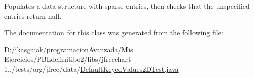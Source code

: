 Populates a data structure with sparse entries, then checks that the unspecified entries return null. 

The documentation for this class was generated from the following file\+:\begin{DoxyCompactItemize}
\item 
D\+:/ikasgaiak/programacion\+Avanzada/\+Mis Ejercicios/\+P\+B\+Ldefinitibo2/libs/jfreechart-\/1../tests/org/jfree/data/\mbox{\hyperlink{_default_keyed_values2_d_test_8java}{Default\+Keyed\+Values2\+D\+Test.\+java}}\end{DoxyCompactItemize}

